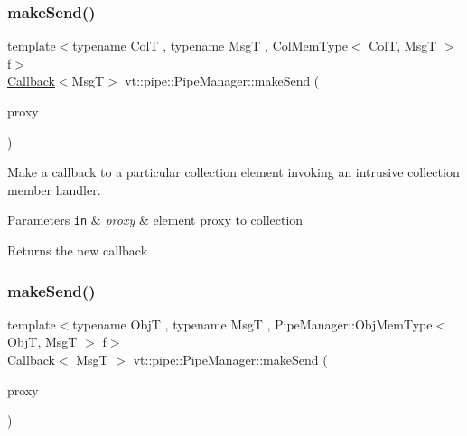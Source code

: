 \subsubsection{\texorpdfstring{make\+Send()}{makeSend()}\hspace{0.1cm}{\footnotesize\ttfamily [5/6]}}
{\footnotesize\ttfamily template$<$typename ColT , typename MsgT , Col\+Mem\+Type$<$ Col\+T, Msg\+T $>$ f$>$ \\
\hyperlink{namespacevt_a36db99df4c973d48b1118a293fff533f}{Callback}$<$MsgT$>$ vt\+::pipe\+::\+Pipe\+Manager\+::make\+Send (\begin{DoxyParamCaption}\item[{typename Col\+T\+::\+Proxy\+Type}]{proxy }\end{DoxyParamCaption})}



Make a callback to a particular collection element invoking an intrusive collection member handler. 


\begin{DoxyParams}[1]{Parameters}
\mbox{\tt in}  & {\em proxy} & element proxy to collection\\
\hline
\end{DoxyParams}
\begin{DoxyReturn}{Returns}
the new callback 
\end{DoxyReturn}
\mbox{\label{structvt_1_1pipe_1_1_pipe_manager_aa5d48a3b64820bec240a6a61bdfb4524}} 
\subsubsection{\texorpdfstring{make\+Send()}{makeSend()}\hspace{0.1cm}{\footnotesize\ttfamily [6/6]}}
{\footnotesize\ttfamily template$<$typename ObjT , typename MsgT , Pipe\+Manager\+::\+Obj\+Mem\+Type$<$ Obj\+T, Msg\+T $>$ f$>$ \\
\hyperlink{namespacevt_a36db99df4c973d48b1118a293fff533f}{Callback}$<$ MsgT $>$ vt\+::pipe\+::\+Pipe\+Manager\+::make\+Send (\begin{DoxyParamCaption}\item[{\hyperlink{structvt_1_1objgroup_1_1proxy_1_1_proxy_elm}{objgroup\+::proxy\+::\+Proxy\+Elm}$<$ ObjT $>$}]{proxy }\end{DoxyParamCaption})}



